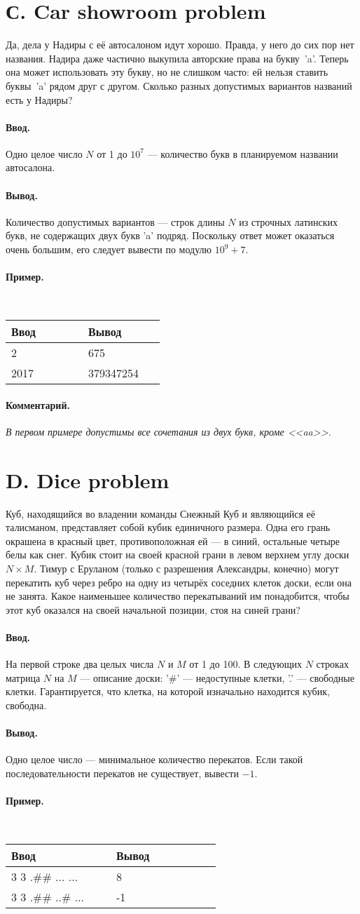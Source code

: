 \documentclass[12pt, a5paper]{article}
\newcommand{\informat}[1]
{
	\paragraph{Ввод.\\} #1
}
\newcommand{\outformat}[1]
{
	\paragraph{Вывод.\\} #1
}
\newcommand{\examplee}[4]
{
	\paragraph{Пример.\\}
	{\tt
	\begin{tabular}{|p{0.4\linewidth}|p{0.4\linewidth}|}
	\hline
	Ввод 	& Вывод  	\\
	\hline
	#1 		& #2 		\\
	\hline
	#3		& #4		\\
	\hline
	\end{tabular}
	}
}
\newcommand{\excomm}[1]
{
	\paragraph{Комментарий. \\}
	\textit{#1}
}
\begin{document}
\section*{С. Car showroom problem}


Да, дела у Надиры с её автосалоном идут хорошо. Правда, у него до сих пор нет названия. Надира даже частично выкупила авторские права на букву~'a'. Теперь она может использовать эту букву, но не слишком часто: ей нельзя ставить буквы~'a' рядом друг с другом. Сколько разных допустимых вариантов названий есть у Надиры?

\informat{Одно целое число $N$ от 1 до $10^7$ --- количество букв в планируемом названии автосалона.}
 
\outformat{Количество допустимых вариантов --- строк длины $N$ из строчных латинских букв, не содержащих двух букв 'a' подряд. Поскольку ответ может оказаться очень большим, его следует вывести по модулю $10^9 + 7$.}
 
\examplee{2}{675}{2017}{379347254}
 
\excomm{В первом примере допустимы все сочетания из двух букв, кроме <<aa>>.}


 
\section*{D. Dice problem}


Куб, находящийся во владении команды Снежный Куб и являющийся её талисманом, представляет собой кубик единичного размера. Одна его грань окрашена в красный цвет, противоположная ей --- в синий, остальные четыре белы как снег. Кубик стоит на своей красной грани в левом верхнем углу доски $N \times M$. Тимур с Еруланом (только с разрешения Александры, конечно) могут перекатить куб через ребро на одну из четырёх соседних клеток доски, если она не занята. Какое наименьшее количество перекатываний им понадобится, чтобы этот куб оказался на своей начальной позиции, стоя на синей грани?

\informat{На первой строке два целых числа $N$ и $M$ от 1 до 100. В следующих $N$ строках матрица $N$ на $M$ --- описание доски: '\#' --- недоступные клетки, '.' --- свободные клетки. Гарантируется, что клетка, на которой изначально находится кубик, свободна.}
 
\outformat{Одно целое число --- минимальное количество перекатов. Если такой по\-сле\-до\-ва\-тель\-нос\-ти перекатов не существует, вывести $-1$.}

\examplee{3 3 \newline
.\#\# \newline
...\newline
...}
{8}
{3 3 \newline
.\#\# \newline
..\#\newline
...}
{-1}
\end{document}
